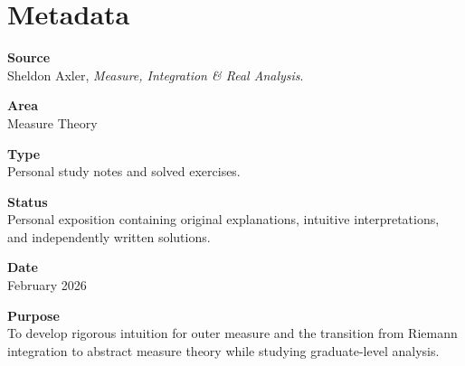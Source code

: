 \section*{Metadata}

\noindent\textbf{Source}\\
Sheldon Axler,
\emph{Measure, Integration \& Real Analysis}.

\bigskip

\noindent\textbf{Area}\\
Measure Theory

\bigskip

\noindent\textbf{Type}\\
Personal study notes and solved exercises.

\bigskip

\noindent\textbf{Status}\\
Personal exposition containing original explanations,
intuitive interpretations,
and independently written solutions.

\bigskip

\noindent\textbf{Date}\\
February 2026

\bigskip

\noindent\textbf{Purpose}\\
To develop rigorous intuition for outer measure and the transition from
Riemann integration to abstract measure theory while studying graduate-level
analysis.